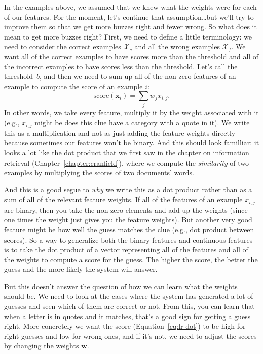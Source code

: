 In the examples above, we assumed that we knew what the weights were for each
of our features.
%
For the moment, let's continue that assumption\dots but we'll try to improve
them so that we get more buzzes right and fewer wrong.
%
So what does it mean to get more buzzes right?  First, we need to define a
little terminology: we need to consider the correct examples $\mathcal{X}_c$
and all the wrong examples $\mathcal{X}_f$.
%
We want all of the correct examples to have scores more than the threshold and
all of the incorrect examples to have scores less than the threshold.
%
Let's call the threshold~$b$, and then we need to sum up all of the non-zero
features of an example to compute the score of an example $i$:
\begin{equation}
  \mbox{score}({\bm x}_i) = \sum_{j} w_j x_{i,j}.
  \label{eq:lr-dot}
\end{equation}
In other words, we take every feature, multiply it by the weight associated
with it (e.g., $x_{i,j}$ might be does this clue have a category with a quote
in it).
%
We write this as a multiplication and not as just adding the feature weights
directly because sometimes our features won't be binary.
%
And this should look familliar: it looks a lot like the dot product that we
first saw in the chapter on information retrieval
(Chapter~\ref{chapter:cranfield}), where we compute the \emph{similarity} of
two examples by multiplying the \tfidf{} scores of two documents' words.

And this is a good segue to \emph{why} we write this as a dot product rather
than as a sum of all of the relevant feature weights.
%
If all of the features of an example $x_{i,j}$ are binary, then you take the
non-zero elements and add up the weights (since one times the weight just
gives you the feature weights).
%
But another very good feature might be how well the guess matches the clue
(e.g., dot product between \tfidf{} scores).
%
So a way to generalize both the binary features and continuous features is to
take the dot product of a vector representing all of the features and all of
the weights to compute a score for the guess.
%
The higher the score, the better the guess and the more likely the system will
answer.

But this doesn't answer the question of how we can learn what the weights
should be.
%
We need to look at the cases where the system has generated a lot of guesses
and seen which of them are correct or not.
%
From this, you can learn that when
a letter is in quotes and it matches, that’s a good sign for getting a guess right.
%
More concretely we want the score (Equation~\ref{eq:lr-dot}) to be high for
right guesses and low for wrong ones, and if it's not, we need to adjust the
scores by changing the weights ${\bm w}$.

